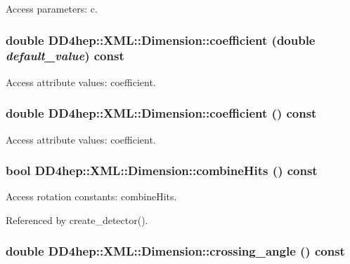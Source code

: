 Access parameters: c. \hypertarget{struct_d_d4hep_1_1_x_m_l_1_1_dimension_aadd3b36cb0b54bb0727f83692d50e1e3}{
\subsubsection[{coefficient}]{\setlength{\rightskip}{0pt plus 5cm}double DD4hep::XML::Dimension::coefficient (double {\em default\_\-value}) const}}
\label{struct_d_d4hep_1_1_x_m_l_1_1_dimension_aadd3b36cb0b54bb0727f83692d50e1e3}


Access attribute values: coefficient. \hypertarget{struct_d_d4hep_1_1_x_m_l_1_1_dimension_afa120850f82ff337fdd41797995a6d2a}{
\subsubsection[{coefficient}]{\setlength{\rightskip}{0pt plus 5cm}double DD4hep::XML::Dimension::coefficient () const}}
\label{struct_d_d4hep_1_1_x_m_l_1_1_dimension_afa120850f82ff337fdd41797995a6d2a}


Access attribute values: coefficient. \hypertarget{struct_d_d4hep_1_1_x_m_l_1_1_dimension_a310d92cb90923f94c304fc42c3077fb0}{
\subsubsection[{combineHits}]{\setlength{\rightskip}{0pt plus 5cm}bool DD4hep::XML::Dimension::combineHits () const}}
\label{struct_d_d4hep_1_1_x_m_l_1_1_dimension_a310d92cb90923f94c304fc42c3077fb0}


Access rotation constants: combineHits. 

Referenced by create\_\-detector().\hypertarget{struct_d_d4hep_1_1_x_m_l_1_1_dimension_a5286de18cc81598b8f64fe3c2cf9f54d}{
\subsubsection[{crossing\_\-angle}]{\setlength{\rightskip}{0pt plus 5cm}double DD4hep::XML::Dimension::crossing\_\-angle () const}}
\label{struct_d_d4hep_1_1_x_m_l_1_1_dimension_a5286de18cc81598b8f64fe3c2cf9f54d}


